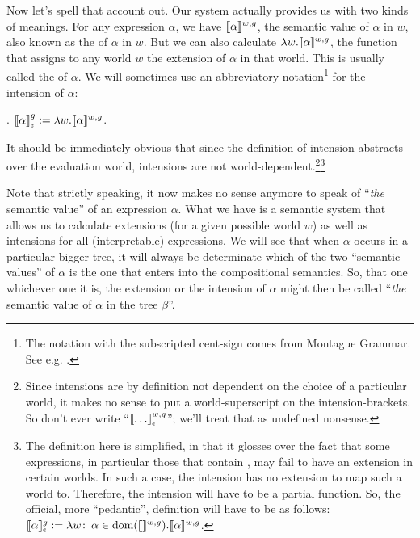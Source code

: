 Now %
%
let's spell that account out. Our system actually provides us with two
kinds of meanings. For any expression $\alpha$, we have
$\llbracket \alpha \rrbracket^{w,g}$, the semantic value of $\alpha$ in $w$, also known
as the  of $\alpha$ in $w$. But we can also calculate
$\lambda w. \llbracket \alpha \rrbracket^{w,g}$, the function that assigns to any world
$w$ the extension of $\alpha$ in that world. This is usually called
the  of $\alpha$. We will sometimes use an
abbreviatory notation\footnote{The notation with the subscripted
  cent-sign comes from Montague Grammar. See e.g.
  \citet[147]{dowty-wall-peters:1981:intro}.} for the intension of
$\alpha$:

\ex. $\svcent{\alpha}^g := \lambda w. \sv{\alpha}^{w,g}$.

It should be immediately obvious that since the definition of
intension abstracts over the evaluation world, intensions are not
world-dependent.\footnote{Since intensions are by definition not
  dependent on the choice of a particular world, it makes no sense to
  put a world-superscript on the intension-brackets. So don't ever
  write ``$\svcent{\dots}^{w,g}$''; we'll treat that as undefined
  nonsense.}\footnote{The definition here is simplified, in that it
  glosses over the fact that some expressions, in particular those
  that contain , may fail to have an
  extension in certain worlds. In such a case, the intension has no
  extension to map such a world to. Therefore, the intension will have
  to be a partial function. So, the official, more ``pedantic'',
  definition will have to be as follows:
  $\sv{\alpha}_{\tiny \mbox{\textcent}}^g := \lambda w\co \alpha \in
  \mbox{dom}(\sv{\null}^{w,g}). \sv{\alpha}^{w,g}$.}

Note that strictly speaking, it now makes no sense anymore to speak of
``\emph{the} semantic value'' of an expression $\alpha$. What we have
is a semantic system that allows us to calculate extensions (for a
given possible world $w$) as well as intensions for all
(interpretable) expressions. We will see that when $\alpha$ occurs in
a particular bigger tree, it will always be determinate which of the
two ``semantic values'' of $\alpha$ is the one that enters into the
compositional semantics. So, that one \dash whichever one it is, the
extension or the intension of $\alpha$ \dash might then be called
``\emph{the} semantic value of $\alpha$ in the tree $\beta$''.

